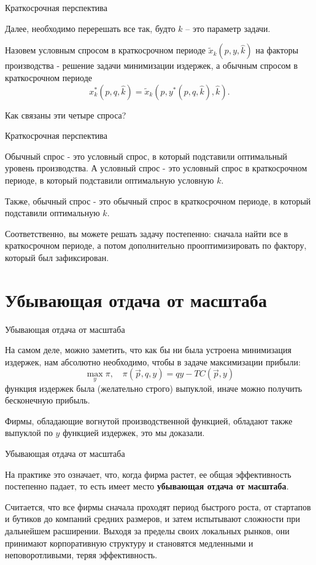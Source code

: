 \documentclass{beamer}
\begin{document}
\begin{frame}{Краткосрочная перспектива}

Далее, необходимо перерешать все так, будто $\hat k$ – это параметр задачи.

\begin{definition}
Назовем условным спросом в краткосрочном периоде $\tilde x_{k}(p, y, \hat k)$ на факторы производства - решение задачи минимизации издержек, а обычным спросом в краткосрочном периоде
$$x_k^{\ast}(p, q, \hat k) = \tilde x_k(p, y^{\ast}(p, q, \hat k), \hat k).$$
\end{definition}
Как связаны эти четыре спроса?

\end{frame}

\begin{frame}{Краткосрочная перспектива}

Обычный спрос - это условный спрос, в который подставили оптимальный уровень производства. А условный спрос - это условный спрос в краткосрочном периоде, в который подставили оптимальную условную $k$.

Также, обычный спрос - это обычный спрос в краткосрочном периоде, в который подставили оптимальную $k$.

Соответственно, вы можете решать задачу постепенно: сначала найти все в краткосрочном периоде, а потом дополнительно прооптимизировать по фактору, который был зафиксирован.

\end{frame}

\section{Убывающая отдача от масштаба}

\begin{frame}{Убывающая отдача от масштаба}

На самом деле, можно заметить, что как бы ни была устроена минимизация издержек, нам абсолютно необходимо, чтобы в задаче максимизации прибыли:
$$ \max_{y} \pi, \quad \pi(\vec p, q, y) = q y - TC(\vec p, y)$$
функция издержек была (желательно строго) выпуклой, иначе можно получить бесконечную прибыль.

Фирмы, обладающие вогнутой производственной функцией, обладают также выпуклой по $y$ функцией издержек, это мы доказали.

\end{frame}

\begin{frame}{Убывающая отдача от масштаба}

На практике это означает, что, когда фирма растет, ее общая эффективность постепенно падает, то есть имеет место \textbf{убывающая отдача от масштаба}.

Считается, что все фирмы сначала проходят период быстрого роста, от стартапов и бутиков до компаний средних размеров, и затем испытывают сложности при дальнейшем расширении. Выходя за пределы своих локальных рынков, они принимают корпоративную структуру и становятся медленными и неповоротливыми, теряя эффективность.

\end{frame}
\end{document}
